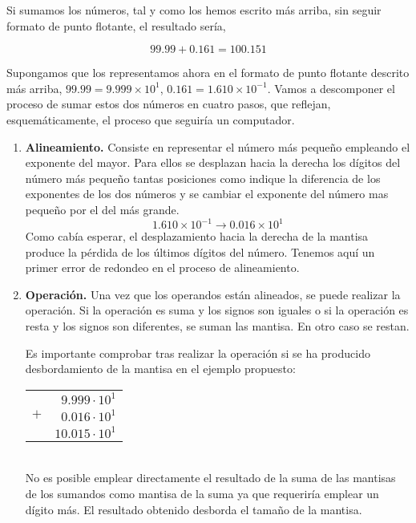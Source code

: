 Si sumamos los números, tal y como los hemos escrito más arriba, sin seguir formato de punto flotante, el resultado sería,

\begin{equation*}
99.99+0.161=100.151
\end{equation*}

Supongamos que los representamos ahora en el formato de punto flotante descrito más arriba, $99.99=9.999\times10^1$, $0.161=1.610\times10^{-1}$. Vamos a descomponer el proceso de sumar estos dos números en cuatro pasos, que reflejan, esquemáticamente, el proceso que seguiría un computador.

\begin{enumerate}
\item \textbf{Alineamiento.} Consiste en representar el número más pequeño empleando el exponente del mayor. Para ellos se desplazan hacia la derecha los dígitos del número más pequeño tantas posiciones como indique la diferencia de los exponentes de los dos números y se cambiar el exponente del número mas pequeño por el del más grande.
\begin{equation*}
1.610\times 10^{-1}\rightarrow 0.016\times10^1
\end{equation*}
Como cabía esperar, el desplazamiento hacia la derecha de la mantisa produce la pérdida de los últimos dígitos del número. Tenemos aquí un primer error de redondeo en el proceso de alineamiento.

\item \textbf{Operación.}
Una vez que los operandos están alineados, se puede realizar la operación. Si la operación es suma y los signos son iguales o si la operación es resta y los signos son diferentes, se suman las mantisa. En otro caso se restan.

Es importante comprobar tras realizar la operación si se ha producido desbordamiento de la mantisa en el ejemplo propuesto:

\begin{tabular}{c r}
&$9.999\cdot10^1$\\
$+$&$0.016\cdot10^1$\\
\hline
&$10.015\cdot10^1$
\end{tabular}\\

No es posible emplear directamente el resultado de la suma de las mantisas de los sumandos como mantisa de la suma ya que requeriría emplear un dígito más. El resultado obtenido desborda el tamaño de la mantisa.


\end{enumerate}

